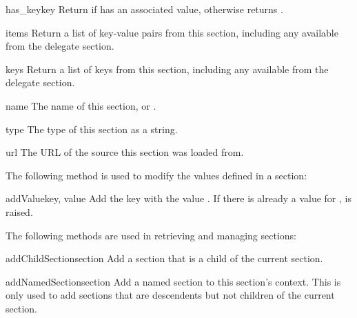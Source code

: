 \documentclass{howto}
\begin{document}
\begin{methoddesc}[Configuration]{has_key}{key}
  Return  if  has an associated value, otherwise
  returns .
\end{methoddesc}

\begin{methoddesc}[Configuration]{items}{}
  Return a list of key-value pairs from this section, including any
  available from the delegate section.
\end{methoddesc}

\begin{methoddesc}[Configuration]{keys}{}
  Return a list of keys from this section, including any available
  from the delegate section.
\end{methoddesc}

\begin{memberdesc}[Configuration]{name}
  The name of this section, or .
\end{memberdesc}

\begin{memberdesc}[Configuration]{type}
  The type of this section as a string.
\end{memberdesc}

\begin{memberdesc}[Configuration]{url}
  The URL of the source this section was loaded from.
\end{memberdesc}


The following method is used to modify the values defined in a
section:

\begin{methoddesc}[Configuration]{addValue}{key, value}
  Add the key  with the value .  If there is
  already a value for ,  is
  raised.
\end{methoddesc}


The following methods are used in retrieving and managing sections:

\begin{methoddesc}[Configuration]{addChildSection}{section}
  Add a section that is a child of the current section.
\end{methoddesc}

\begin{methoddesc}[Configuration]{addNamedSection}{section}
  Add a named section to this section's context.  This is only used to
  add sections that are descendents but not children of the current
  section.
\end{methoddesc}
\end{document}
